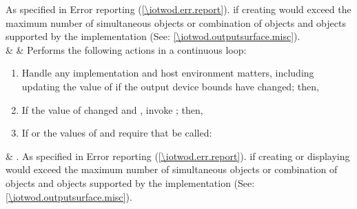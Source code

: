 \begin{libreqtab4d}
\throws
As specified in Error reporting (\ref{\iotwod.err.report}).\newline%
\errors
{} if creating  would exceed the maximum number of simultaneous  objects or combination of  objects and  objects supported by the implementation (See: \ref{\iotwod.outputsurface.misc}).
	\\ \rowsep
{}\newline%
	&
	&
Performs the following actions in a continuous loop:
\begin{enumerate}
\item Handle any implementation and host environment matters, including updating the value of  if the output device bounds have changed; then,
\item If the value of  changed and , invoke ; then,
\item If  or the values of  and  require that  be called:
\end{enumerate}	&
\requires
{}.\newline%
\throws
As specified in Error reporting (\ref{\iotwod.err.report}).\newline%
\errors
{} if creating or displaying  would exceed the maximum number of simultaneous  objects or combination of  objects and  objects supported by the implementation (See: \ref{\iotwod.outputsurface.misc}).
\\

\end{libreqtab4d}
